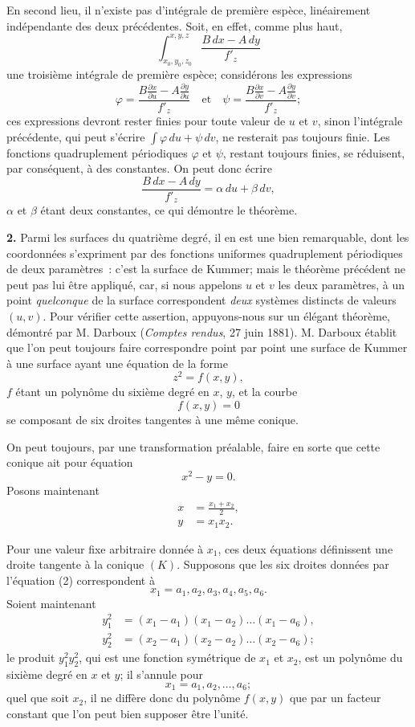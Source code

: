 \documentclass{article}
\begin{document}
En second lieu, il n'existe pas d'intégrale de première espèce, linéairement indépendante des deux précédentes. Soit, en effet, comme plus haut,
\[
\int_{x_{0}, y_{0}, z_{0}}^{x, y, z} \frac{B\,dx - A\,dy}{f'_{z}}
\]
une troisième intégrale de première espèce; considérons les expressions
\[
\varphi = \frac{B \frac{\partial x}{\partial u} - A \frac{\partial y}{\partial u}}{f'_{z}} \quad \text{et} \quad \psi = \frac{B \frac{\partial x}{\partial v} - A \frac{\partial y}{\partial v}}{f'_{z}};
\]
ces expressions devront rester finies pour toute valeur de $u$ et $v$, sinon l'intégrale précédente, qui peut s'écrire $\displaystyle\int \varphi\,du + \psi\,dv$, ne resterait pas toujours finie. Les fonctions quadruplement périodiques $\varphi$ et $\psi$, restant
toujours finies, se réduisent, par conséquent, à des constantes. On peut donc écrire
\[
\frac{B\,dx - A\,dy}{f'_{z}} = \alpha\,du + \beta\,dv,
\]
$\alpha$ et $\beta$ étant deux constantes, ce qui démontre le théorème.

\textbf{2.} Parmi les surfaces du quatrième degré, il en est une bien remarquable, dont les coordonnées s'expriment par des fonctions uniformes quadruplement périodiques de deux paramètres~: c'est la surface de Kummer; mais le théorème précédent ne peut pas lui être appliqué, car, si nous appelons $u$ et $v$ les deux paramètres, à un point \emph{quelconque} de la surface correspondent \emph{deux} systèmes distincts de valeurs $(u, v)$. Pour vérifier cette assertion, appuyons-nous sur un élégant théorème, démontré par M. Darboux (\emph{Comptes rendus}, 27 juin 1881). M. Darboux établit que l'on peut toujours faire correspondre point par point une surface de Kummer à une surface ayant une équation de la forme
\[
z^{2} = f(x, y),
\tag{1}
\]
$f$ étant un polynôme du sixième degré en $x$, $y$, et la courbe
\[
f(x, y) = 0
\tag{2}
\]
se composant de six droites tangentes à une même conique.

On peut toujours, par une transformation préalable, faire en sorte que cette conique ait pour équation
\[
x^{2} - y = 0.
\tag{K}
\]
Posons maintenant
\[
\begin{aligned}
x &= \frac{x_{1} + x_{2}}{2}, \\
y &= x_{1}x_{2}.
\end{aligned}
\]

Pour une valeur fixe arbitraire donnée à $x_{1}$, ces deux équations définissent une droite tangente à la conique $(K)$. Supposons que les six
droites données par l'équation (2) correspondent à
\[
x_{1} = a_{1}, a_{2}, a_{3}, a_{4}, a_{5}, a_{6}.
\]
Soient maintenant
\[
\begin{aligned}
y_{1}^{2} &= (x_{1} - a_{1})(x_{1} - a_{2})\ldots(x_{1} - a_{6}), \\
y_{2}^{2} &= (x_{2} - a_{1})(x_{2} - a_{2})\ldots(x_{2} - a_{6});
\end{aligned}
\]
le produit $y_{1}^{2}y_{2}^{2}$, qui est une fonction symétrique de $x_{1}$ et $x_{2}$, est un polynôme du sixième degré en $x$ et $y$; il s'annule pour
\[
x_{1} = a_{1}, a_{2}, \ldots, a_{6};
\]
quel que soit $x_{2}$, il ne diffère donc du polynôme $f(x, y)$ que par un facteur constant que l'on peut bien supposer être l'unité.
\end{document}
